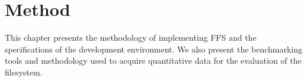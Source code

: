 
\chapter{Method}
\label{ch:methods}

This chapter presents the methodology of implementing \gls{FFS} and the specifications of the development environment. We also present the benchmarking tools and methodology used to acquire quantitative data for the evaluation of the filesystem.





